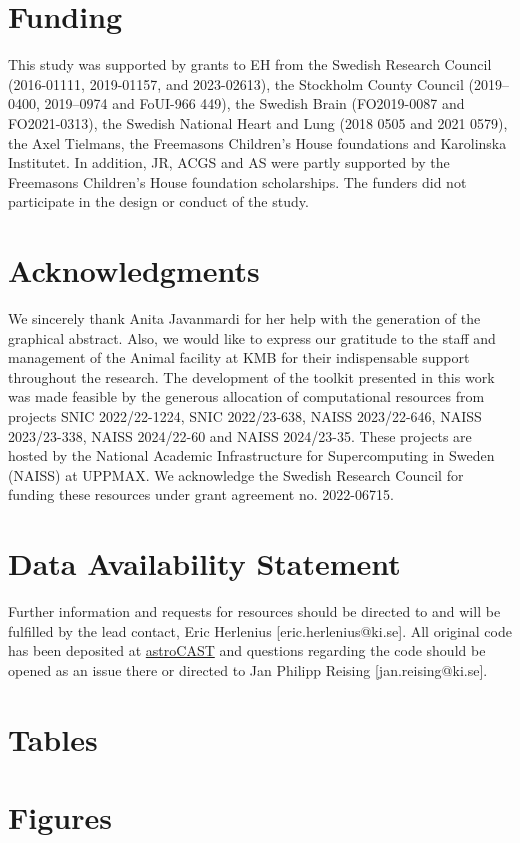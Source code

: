 \documentclass{article}
\begin{document}
    \section*{Funding}
    This study was supported by grants to EH from the Swedish Research Council (2016-01111, 2019-01157, and 2023-02613), the Stockholm County Council (2019–0400, 2019–0974 and FoUI-966 449), the Swedish Brain (FO2019-0087 and FO2021-0313), the Swedish National Heart and Lung (2018 0505 and 2021 0579), the Axel Tielmans, the Freemasons Children's House foundations and Karolinska Institutet. In addition, JR, ACGS and AS were partly supported by the Freemasons Children’s House foundation scholarships. The funders did not participate in the design or conduct of the study.

    \section*{Acknowledgments}
    We sincerely thank Anita Javanmardi for her help with the generation of the graphical abstract. Also, we would like to express our gratitude to the staff and management of the Animal facility at KMB for their indispensable support throughout the research. The development of the toolkit presented in this work was made feasible by the generous allocation of computational resources from projects SNIC 2022/22-1224, SNIC 2022/23-638, NAISS 2023/22-646, NAISS 2023/23-338, NAISS 2024/22-60 and NAISS 2024/23-35. These projects are hosted by the National Academic Infrastructure for Supercomputing in Sweden (NAISS) at UPPMAX. We acknowledge the Swedish Research Council for funding these resources under grant agreement no. 2022-06715.

    \section*{Data Availability Statement}
    Further information and requests for resources  should be directed to and will be fulfilled by the lead contact, Eric Herlenius [eric.herlenius@ki.se]. All original code has been deposited at \href{https://github.com/janreising/astroCAST}{astroCAST} and questions regarding the code should be opened as an issue there or directed to Jan Philipp Reising [jan.reising@ki.se].
%
    

    \section*{Tables}
    

    \section*{Figures}
    
\end{document}
